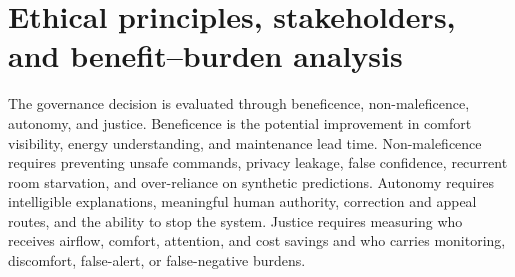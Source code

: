 \section{Ethical principles, stakeholders, and benefit--burden analysis}
The governance decision is evaluated through beneficence, non-maleficence, autonomy, and justice. Beneficence is the potential improvement in comfort visibility, energy understanding, and maintenance lead time. Non-maleficence requires preventing unsafe commands, privacy leakage, false confidence, recurrent room starvation, and over-reliance on synthetic predictions. Autonomy requires intelligible explanations, meaningful human authority, correction and appeal routes, and the ability to stop the system. Justice requires measuring who receives airflow, comfort, attention, and cost savings and who carries monitoring, discomfort, false-alert, or false-negative burdens.

